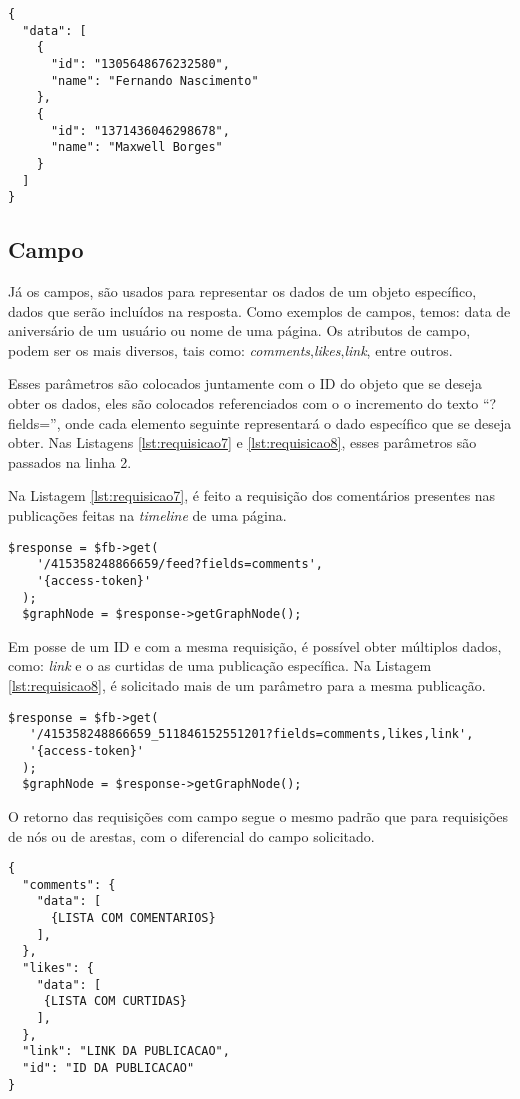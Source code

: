 \begin{lstlisting}[caption={Resposta da requisição \ref{lst:curtidasComentario} (Likes)},label={lst:respostaCurtidas}]
{
  "data": [
    {
      "id": "1305648676232580",
      "name": "Fernando Nascimento"
    },
    {
      "id": "1371436046298678",
      "name": "Maxwell Borges"
    }
  ]
}
\end{lstlisting} 

\subsection{Campo}
Já os campos, são usados para representar os dados de um objeto específico, dados que serão incluídos na resposta. Como exemplos de campos, temos: data de aniversário de um usuário ou nome de uma página. Os atributos de campo, podem ser os mais diversos, tais como: \textit{comments},\textit{likes},\textit{link}, entre outros. 

Esses parâmetros são colocados juntamente com o ID do objeto que se deseja obter os dados, eles são colocados referenciados com o o incremento do texto ``?fields='', onde cada elemento seguinte representará o dado específico que se deseja obter. Nas Listagens \ref{lst:requisicao7} e \ref{lst:requisicao8}, esses parâmetros são passados na linha 2.

Na Listagem \ref{lst:requisicao7}, é feito a requisição dos comentários presentes nas publicações feitas na \textit{timeline} de uma página.

\begin{lstlisting}[caption={Requisitar os comentários de todas as publicações da página},label={lst:requisicao7}]
  $response = $fb->get(
    '/415358248866659/feed?fields=comments',
    '{access-token}' 
  );
  $graphNode = $response->getGraphNode(); 
\end{lstlisting}

Em posse de um ID e com a mesma requisição, é possível obter múltiplos dados, como: \textit{link} e o as curtidas de uma publicação específica. Na Listagem \ref{lst:requisicao8}, é solicitado mais de um parâmetro para a mesma publicação.

\begin{lstlisting}[caption={Requisição de múltiplos campos},label={lst:requisicao8}]
  $response = $fb->get(
   '/415358248866659_511846152551201?fields=comments,likes,link', 
   '{access-token}'
  );
  $graphNode = $response->getGraphNode();
\end{lstlisting}

O retorno das requisições com campo segue o mesmo padrão que para requisições de nós ou de arestas, com o diferencial do campo solicitado.

\begin{lstlisting}[caption={Retorno da requisição \ref{lst:requisicao8} (Campos)}, label={lst:retornoRequisicao8}]
{
  "comments": {
    "data": [
      {LISTA COM COMENTARIOS}
    ],
  },
  "likes": {
    "data": [
     {LISTA COM CURTIDAS}
    ],
  },
  "link": "LINK DA PUBLICACAO",
  "id": "ID DA PUBLICACAO"
}
\end{lstlisting}